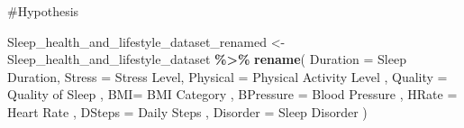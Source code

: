 \documentclass[
  11pt,
]{article}
\newenvironment{Shaded}{\begin{snugshade}}{\end{snugshade}}
\newcommand{\AttributeTok}[1]{\textcolor[rgb]{0.13,0.29,0.53}{#1}}
\newcommand{\FunctionTok}[1]{\textcolor[rgb]{0.13,0.29,0.53}{\textbf{#1}}}
\newcommand{\NormalTok}[1]{#1}
\newcommand{\OtherTok}[1]{\textcolor[rgb]{0.56,0.35,0.01}{#1}}
\newcommand{\SpecialCharTok}[1]{\textcolor[rgb]{0.81,0.36,0.00}{\textbf{#1}}}
\newcommand{\StringTok}[1]{\textcolor[rgb]{0.31,0.60,0.02}{#1}}
\begin{document}
\#Hypothesis

\begin{Shaded}
\begin{Highlighting}[]
\NormalTok{Sleep\_health\_and\_lifestyle\_dataset\_renamed }\OtherTok{\textless{}{-}}\NormalTok{ Sleep\_health\_and\_lifestyle\_dataset }\SpecialCharTok{\%\textgreater{}\%}
  \FunctionTok{rename}\NormalTok{( }\AttributeTok{Duration =} \StringTok{\textquotesingle{}Sleep Duration\textquotesingle{}}\NormalTok{,}
          \AttributeTok{Stress =} \StringTok{\textquotesingle{}Stress Level\textquotesingle{}}\NormalTok{,}
          \AttributeTok{Physical =} \StringTok{\textquotesingle{}Physical Activity Level\textquotesingle{}}\NormalTok{ ,}
          \AttributeTok{Quality =} \StringTok{\textquotesingle{}Quality of Sleep\textquotesingle{}}\NormalTok{ ,}
          \AttributeTok{BMI=} \StringTok{\textquotesingle{}BMI Category\textquotesingle{}}\NormalTok{ ,}
          \AttributeTok{BPressure =} \StringTok{\textquotesingle{}Blood Pressure\textquotesingle{}}\NormalTok{ ,}
          \AttributeTok{HRate =} \StringTok{\textquotesingle{}Heart Rate\textquotesingle{}}\NormalTok{ ,}
          \AttributeTok{DSteps =} \StringTok{\textquotesingle{}Daily Steps\textquotesingle{}}\NormalTok{ ,}
          \AttributeTok{Disorder =} \StringTok{\textquotesingle{}Sleep Disorder\textquotesingle{}}\NormalTok{ )}
\end{Highlighting}
\end{Shaded}

\begin{Shaded}
\end{Shaded}
\end{document}
